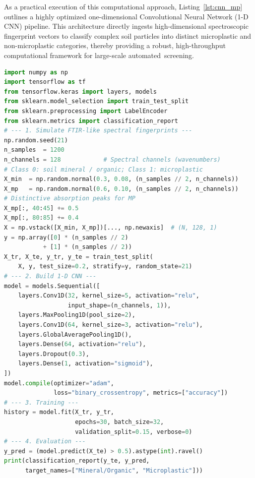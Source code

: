 \documentclass[environremediat,article,accept,pdftex,oneauthor]{Definitions/mdpi}
\begin{document}
As a practical execution of this computational approach, Listing~\ref{lst:cnn_mp} outlines a highly optimized one-dimensional Convolutional Neural Network (1-D CNN) pipeline. This architecture directly ingests high-dimensional spectroscopic fingerprint vectors to classify complex soil particles into distinct microplastic and non-microplastic categories, thereby providing a robust, high-throughput computational framework for large-scale \mbox{automated screening.}

\begin{lstlisting}[language=Python,basicstyle=\scriptsize\ttfamily,
    caption={Python %MDPI: Please check and confirm if * should be revised to multiplication sign.
% AUTHOR: The asterisk is the Python multiplication operator within the code and is correct as written; it should not be revised to a multiplication sign.
 workflow: 1-D Convolutional Neural Network (CNN) for
             microplastic classification from spectral fingerprints
             (Script~3).\vspace{4pt}},
    label={lst:cnn_mp},xleftmargin=12pt,xrightmargin=3.5pt]
import numpy as np
import tensorflow as tf
from tensorflow.keras import layers, models
from sklearn.model_selection import train_test_split
from sklearn.preprocessing import LabelEncoder
from sklearn.metrics import classification_report
# --- 1. Simulate FTIR-like spectral fingerprints ---
np.random.seed(21)
n_samples  = 1200
n_channels = 128            # Spectral channels (wavenumbers)
# Class 0: soil mineral / organic; Class 1: microplastic
X_min  = np.random.normal(0.3, 0.08, (n_samples // 2, n_channels))
X_mp   = np.random.normal(0.6, 0.10, (n_samples // 2, n_channels))
# Distinctive absorption peaks for MP
X_mp[:, 40:45] += 0.5
X_mp[:, 80:85] += 0.4
X = np.vstack([X_min, X_mp])[..., np.newaxis]  # (N, 128, 1)
y = np.array([0] * (n_samples // 2)
           + [1] * (n_samples // 2))
X_tr, X_te, y_tr, y_te = train_test_split(
    X, y, test_size=0.2, stratify=y, random_state=21)
# --- 2. Build 1-D CNN ---
model = models.Sequential([
    layers.Conv1D(32, kernel_size=5, activation="relu",
                  input_shape=(n_channels, 1)),
    layers.MaxPooling1D(pool_size=2),
    layers.Conv1D(64, kernel_size=3, activation="relu"),
    layers.GlobalAveragePooling1D(),
    layers.Dense(64, activation="relu"),
    layers.Dropout(0.3),
    layers.Dense(1, activation="sigmoid"),
])
model.compile(optimizer="adam",
              loss="binary_crossentropy", metrics=["accuracy"])
# --- 3. Training ---
history = model.fit(X_tr, y_tr,
                    epochs=30, batch_size=32,
                    validation_split=0.15, verbose=0)
# --- 4. Evaluation ---
y_pred = (model.predict(X_te) > 0.5).astype(int).ravel()
print(classification_report(y_te, y_pred,
      target_names=["Mineral/Organic", "Microplastic"]))
\end{lstlisting}
\end{document}
